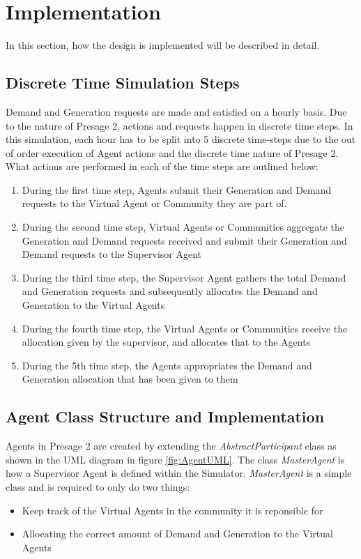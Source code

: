 \chapter{Implementation}
\label{Implementation}
In this section, how the design is implemented will be described in detail. 

\section*{Discrete Time Simulation Steps}
Demand and Generation requests are made and satisfied on a hourly basis. Due to the nature of Presage 2, actions and requests happen in discrete time steps. In this simulation, each hour has to be split into 5 discrete time-steps due to the out of order execution of Agent actions and the discrete time nature of Presage 2. What actions are performed in each of the time steps are outlined below:
\begin{enumerate}
	\item During the first time step, Agents submit their Generation and Demand requests to the Virtual Agent or Community they are part of.
	\item During the second time step, Virtual Agents or Communities aggregate the Generation and Demand requests received and submit their Generation and Demand requests to the Supervisor Agent
	\item During the third time step, the Supervisor Agent gathers the total Demand and Generation requests and subsequently allocates the Demand and Generation to the Virtual Agents
	\item During the fourth time step, the Virtual Agents or Communities receive the allocation given by the supervisor, and allocates that to the Agents
	\item During the 5th time step, the Agents appropriates the Demand and Generation allocation that has been given to them
\end{enumerate}

\section*{Agent Class Structure and Implementation}
Agents in Presage 2 are created by extending the \textit{AbstractParticipant} class as shown in the UML diagram in figure \ref{fig:AgentUML}. The class \textit{MasterAgent} is how a Supervisor Agent is defined within the Simulator. \textit{MasterAgent} is a simple class and is required to only do two things:
\begin{itemize}
	\item Keep track of the Virtual Agents in the community it is reponsible for
	\item Allocating the correct amount of Demand and Generation to the Virtual Agents
\end{itemize}

